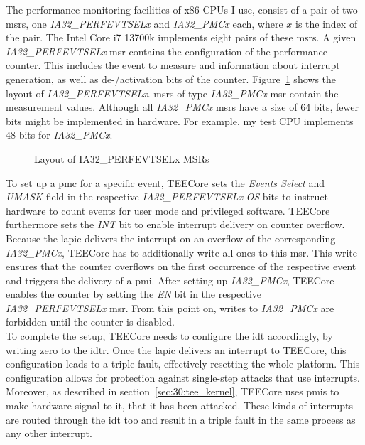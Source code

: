 The performance monitoring facilities of x86 CPUs I use, consist of a pair of
two \glspl{msr}, one \textit{IA32\_PERFEVTSELx} and \textit{IA32\_PMCx} each,
where $x$ is the index of the pair. The Intel Core i7 13700k implements eight
pairs of these \glspl{msr}. A given \textit{IA32\_PERFEVTSELx} \gls{msr}
contains the configuration of the performance counter. This includes the event
to measure and information about interrupt generation, as well as de-/activation
bits of the counter. Figure~\ref{fig:state:technical:perfsel} shows the layout
of \textit{IA32\_PERFEVTSELx}. \glspl{msr} of type \textit{IA32\_PMCx} \gls{msr}
contain the measurement values. Although all \textit{IA32\_PMCx} \glspl{msr}
have a size of 64 bits, fewer bits might be implemented in hardware. For
example, my test CPU implements 48 bits for \textit{IA32\_PMCx}.

\begin{center}
  \begin{figure}
    \centering
    
    \caption{Layout of IA32\_PERFEVTSELx MSRs}
    \label{fig:state:technical:perfsel}
  \end{figure}
\end{center}

To set up a \gls{pmc} for a specific event, TEECore sets the \textit{Events
Select} and \textit{UMASK} field in the respective \textit{IA32\_PERFEVTSELx}
\textit{OS} bits to instruct hardware to count events for user mode and
privileged software. TEECore furthermore sets the \textit{INT} bit to enable
interrupt delivery on counter overflow. Because the \gls{lapic} delivers the
interrupt on an overflow of the corresponding \textit{IA32\_PMCx}, TEECore has
to additionally write all ones to this \gls{msr}. This write ensures that the
counter overflows on the first occurrence of the respective event and triggers
the delivery of a \gls{pmi}. After setting up \textit{IA32\_PMCx}, TEECore
enables the counter by setting the \textit{EN} bit in the respective
\textit{IA32\_PERFEVTSELx} \gls{msr}. From this point on, writes to
\textit{IA32\_PMCx} are forbidden until the counter is disabled.\\

To complete the setup, TEECore needs to configure the \gls{idt} accordingly, by
writing zero to the \gls{idtr}. Once the \gls{lapic} delivers an interrupt to
TEECore, this configuration leads to a triple fault, effectively resetting the
whole platform. This configuration allows for protection against single-step
attacks that use interrupts. Moreover, as described in
section~\ref{sec:30:tee_kernel}, TEECore uses \glspl{pmi} to make hardware
signal to it, that it has been attacked. These kinds of interrupts are routed
through the \gls{idt} too and result in a triple fault in the same process as
any other interrupt.\\

